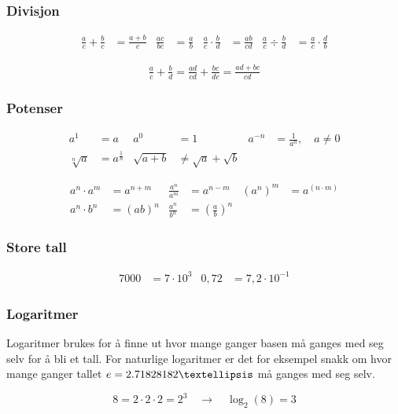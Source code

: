 \documentclass[12pt,norsk,a4paper]{article}
\begin{document}
\subsubsection*{Divisjon}
\begin{align*}
\frac{a}{c} + \frac{b}{c} &= \frac{a+b}{c}		&	\frac{ac}{bc} &= \frac{a}{b}	&	\frac{a}{c} \cdot \frac{b}{d} &= \frac{ab}{cd}	&	\frac{a}{c} \div \frac{b}{d} &= \frac{a}{c} \cdot \frac{d}{b}
\end{align*}

\begin{align*}
\frac{a}{c} + \frac{b}{d} = \frac{ad}{cd} + \frac{bc}{dc} = \frac{ad + bc}{cd}
\end{align*}

\subsubsection*{Potenser}
\begin{align*}
a^{1} &= a						&	a^{0} &= 1	&	a^{-n} &= \frac{1}{a^{n}}, \quad a \neq 0	\\
\sqrt[n]{a} &= a^{\frac{1}{n}}	&	\sqrt{a+b} &\neq \sqrt{a} + \sqrt{b}
\end{align*}

\begin{align*}
a^{n} \cdot a^{m} &= a^{n+m}	&	\frac{a^{n}}{a^{m}} &= a^{n-m}				&	(a^{n})^{m} &= a^{(n \cdot m)}	\\
a^{n} \cdot b^{n} &= (ab)^{n}	&	\frac{a^{n}}{b^{n}} &= (\frac{a}{b})^{n}
\end{align*}

\subsubsection*{Store tall}
\begin{align*}
7000 &= 7 \cdot 10^{3}	&	0,72 &= 7,2 \cdot 10^{-1}
\end{align*}

\subsubsection*{Logaritmer}
Logaritmer brukes for å finne ut hvor mange ganger basen må ganges med seg selv for å bli et tall. For naturlige logaritmer er det for eksempel snakk om hvor mange ganger tallet $e = 2.71828182 \textellipsis$ må ganges med seg selv.

\begin{equation}
8 = 2 \cdot 2 \cdot 2 = 2^{3}	\quad	\rightarrow	\quad	\log_2 (8) = 3 
\end{equation}
\end{document}
